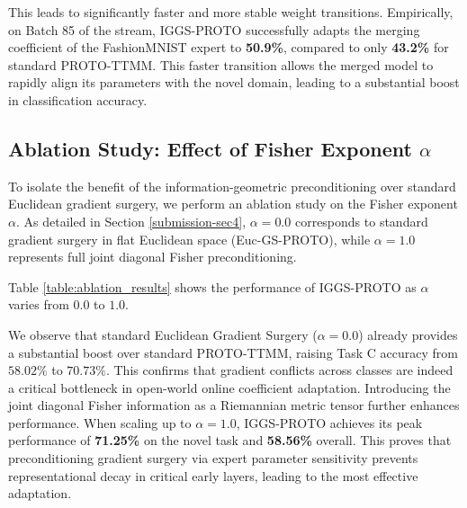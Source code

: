 \documentclass{article}
\theoremstyle{plain}
\theoremstyle{definition}
\theoremstyle{remark}
\begin{document}
This leads to significantly faster and more stable weight transitions. Empirically, on Batch 85 of the stream, IGGS-PROTO successfully adapts the merging coefficient of the FashionMNIST expert to \textbf{50.9\%}, compared to only \textbf{43.2\%} for standard PROTO-TTMM. This faster transition allows the merged model to rapidly align its parameters with the novel domain, leading to a substantial boost in classification accuracy.

\subsection{Ablation Study: Effect of Fisher Exponent $\alpha$}
To isolate the benefit of the information-geometric preconditioning over standard Euclidean gradient surgery, we perform an ablation study on the Fisher exponent $\alpha$. As detailed in Section \ref{submission-sec4}, $\alpha = 0.0$ corresponds to standard gradient surgery in flat Euclidean space (Euc-GS-PROTO), while $\alpha = 1.0$ represents full joint diagonal Fisher preconditioning.

Table \ref{table:ablation_results} shows the performance of IGGS-PROTO as $\alpha$ varies from $0.0$ to $1.0$.

We observe that standard Euclidean Gradient Surgery ($\alpha = 0.0$) already provides a substantial boost over standard PROTO-TTMM, raising Task C accuracy from $58.02\%$ to $70.73\%$. This confirms that gradient conflicts across classes are indeed a critical bottleneck in open-world online coefficient adaptation. Introducing the joint diagonal Fisher information as a Riemannian metric tensor further enhances performance. When scaling up to $\alpha = 1.0$, IGGS-PROTO achieves its peak performance of \textbf{71.25\%} on the novel task and \textbf{58.56\%} overall. This proves that preconditioning gradient surgery via expert parameter sensitivity prevents representational decay in critical early layers, leading to the most effective adaptation.
\end{document}
